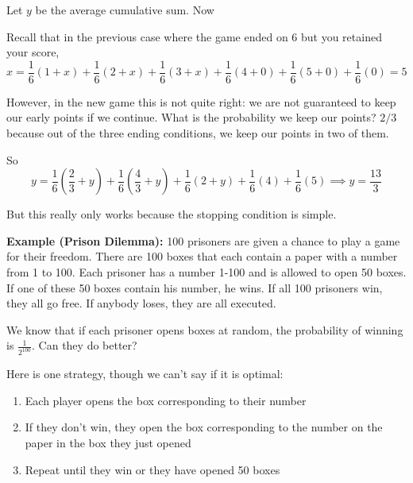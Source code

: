 \documentclass[12pt]{report}
\begin{document}
    Let $y$ be the average cumulative sum. Now 

    \begin{center}
    \end{center}

    Recall that in the previous case where the game ended on 6 but you retained your score, 
    \[x = \frac{1}{6}(1 + x) + \frac{1}{6}(2 + x) + \frac{1}{6}(3 + x) + \frac{1}{6}(4 + 0) + \frac{1}{6}(5 + 0) + \frac{1}{6}(0) = 5\]

    However, in the new game this is not quite right: we are not guaranteed to keep our early points if we continue. What is the probability we keep our points? $2/3$ because out of the three ending conditions, we keep our points in two of them.

    So 
    \[y = \frac{1}{6}(\frac{2}{3} + y) + \frac{1}{6}(\frac{4}{3} + y) + \frac{1}{6}(2 + y) + \frac{1}{6}(4) + \frac{1}{6}(5) \implies \boxed{y = \frac{13}{3}}\]

    But this really only works because the stopping condition is simple. 

    \textbf{Example (Prison Dilemma):} 100 prisoners are given a chance to play a game for their freedom. There are 100 boxes that each contain a paper with a number from 1 to 100. Each prisoner has a number 1-100 and is allowed to open 50 boxes. If one of these 50 boxes contain his number, he wins. If all 100 prisoners win, they all go free. If anybody loses, they are all executed. 

    We know that if each prisoner opens boxes at random, the probability of winning is $\frac{1}{2^{100}}$. Can they do better?

    Here is one strategy, though we can't say if it is optimal: 
    \begin{enumerate}
        \item Each player opens the box corresponding to their number
        \item If they don't win, they open the box corresponding to the number on the paper in the box they just opened
        \item Repeat until they win or they have opened 50 boxes
    \end{enumerate}
\end{document}
